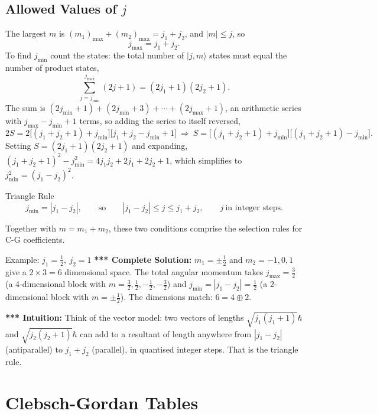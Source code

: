\documentclass[11pt,a4paper]{article}
\begin{document}
\subsection{Allowed Values of \texorpdfstring{$j$}{j}}
The largest $m$ is $(m_1)_{\max}+(m_2)_{\max}=j_1+j_2$, and $|m|\le j$, so
\[
j_{\max}=j_1+j_2 .
\]
To find $j_{\min}$ count the states: the total number of $|j,m\rangle$ states must equal the number of product states,
\[
\sum_{j=j_{\min}}^{j_{\max}}(2j+1)=(2j_1+1)(2j_2+1).
\]
The sum is $(2j_{\min}+1)+(2j_{\min}+3)+\cdots+(2j_{\max}+1)$, an arithmetic series with $j_{\max}-j_{\min}+1$ terms, so adding the series to itself reversed,
\[
2S=2\big[(j_1+j_2+1)+j_{\min}\big]\big[j_1+j_2-j_{\min}+1\big]\ \Rightarrow\ S=\big[(j_1+j_2+1)+j_{\min}\big]\big[(j_1+j_2+1)-j_{\min}\big].
\]
Setting $S=(2j_1+1)(2j_2+1)$ and expanding, $(j_1+j_2+1)^2-j_{\min}^2=4j_1j_2+2j_1+2j_2+1$, which simplifies to $j_{\min}^2=(j_1-j_2)^2$.

\begin{thm}{Triangle Rule}
\[
j_{\min}=|j_1-j_2|,\qquad\text{so}\qquad |j_1-j_2|\le j\le j_1+j_2,\qquad j\ \text{in integer steps.}
\]
\end{thm}
Together with $m=m_1+m_2$, these two conditions comprise the selection rules for C-G coefficients.

\begin{prob}{Example: $j_1=\tfrac12,\ j_2=1$}
\textbf{*** Complete Solution:} $m_1=\pm\tfrac12$ and $m_2=-1,0,1$ give a $2\times3=6$ dimensional space. The total angular momentum takes $j_{\max}=\tfrac32$ (a 4-dimensional block with $m=\tfrac32,\tfrac12,-\tfrac12,-\tfrac32$) and $j_{\min}=|j_1-j_2|=\tfrac12$ (a 2-dimensional block with $m=\pm\tfrac12$). The dimensions match: $6=4\oplus2$.
\end{prob}

\textbf{*** Intuition:} Think of the vector model: two vectors of lengths $\sqrt{j_1(j_1+1)}\hbar$ and $\sqrt{j_2(j_2+1)}\hbar$ can add to a resultant of length anywhere from $|j_1-j_2|$ (antiparallel) to $j_1+j_2$ (parallel), in quantised integer steps. That is the triangle rule.

\section{Clebsch-Gordan Tables}
\label{sy:sec:cgtab}
\end{document}
